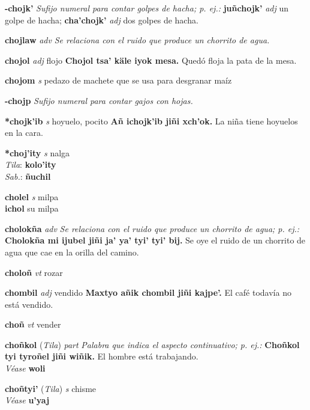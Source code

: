 \documentclass[10pt]{scrbook}
\newcommand{\entry}[1]{\textbf{#1}}
\newcommand{\nontranslationdef}[1]{\textit{#1}}
\newcommand{\partofspeech}[1]{\textit{#1}}
\newcommand{\spanishtranslation}[1]{#1}
\newcommand{\cholexample}[1]{\textbf{#1}}
\newcommand{\exampletranslation}[1]{#1}
\newcommand{\dialectvariant}[1]{\\\textit{#1}:}
\newcommand{\dialectword}[1]{\textbf{#1}}
\newcommand{\alsosee}[1]{\\\textit{Véase} \textbf{#1}}
\newcommand{\relevantdialect}[1]{(\textit{#1})}
\newcommand{\secondaryentry}[1]{\\\textbf{#1}}
\newcommand{\secondpartofspeech}[1]{\textit{#1}}
\newcommand{\secondtranslation}[1]{#1}
\begin{document}
\begin{multicols}{2}
\entry{-chojk'}
\nontranslationdef{Sufijo numeral para contar golpes de hacha; p. ej.:}
\cholexample{juñchojk'}
\secondpartofspeech{adj}
\exampletranslation{un golpe de hacha;}
\cholexample{cha'chojk'}
\secondpartofspeech{adj}
\exampletranslation{dos golpes de hacha.}

\entry{chojlaw}
\partofspeech{adv}
\nontranslationdef{Se relaciona con el ruido que produce un chorrito de agua.}

\entry{chojol}
\partofspeech{adj}
\spanishtranslation{flojo}
\cholexample{Chojol tsa' käle iyok mesa.}
\exampletranslation{Quedó floja la pata de la mesa.}

\entry{chojom}
\partofspeech{s}
\spanishtranslation{pedazo de machete que se usa para desgranar maíz}

\entry{-chojp}
\nontranslationdef{Sufijo numeral para contar gajos con hojas.}

\entry{*chojk'ib}
\partofspeech{s}
\spanishtranslation{hoyuelo, pocito}
\cholexample{Añ ichojk'ib jiñi xch'ok.}
\exampletranslation{La niña tiene hoyuelos en la cara.}

\entry{*choj'ity}
\partofspeech{s}
\spanishtranslation{nalga}
\dialectvariant{Tila}
\dialectword{kolo'ity}
\dialectvariant{Sab.}
\dialectword{ñuchil}

\entry{cholel}
\partofspeech{s}
\spanishtranslation{milpa}
\secondaryentry{ichol}
\secondtranslation{su milpa}

\entry{cholokña}
\partofspeech{adv}
\nontranslationdef{Se relaciona con el ruido que produce un chorrito de agua; p. ej.:}
\cholexample{Cholokña mi ijubel jiñi ja' ya' tyi' tyi' bij.}
\exampletranslation{Se oye el ruido de un chorrito de agua que cae en la orilla del camino.}

\entry{choloñ}
\partofspeech{vt}
\spanishtranslation{rozar}

\entry{chombil}
\partofspeech{adj}
\spanishtranslation{vendido}
\cholexample{Maxtyo añik chombil jiñi kajpe'.}
\exampletranslation{El café todavía no está vendido.}

\entry{choñ}
\partofspeech{vt}
\spanishtranslation{vender}

\entry{choñkol}
\relevantdialect{Tila}
\partofspeech{part}
\nontranslationdef{Palabra que indica el aspecto continuativo; p. ej.:}
\cholexample{Choñkol tyi tyroñel jiñi wiñik.}
\exampletranslation{El hombre está trabajando.}
\alsosee{woli}

\entry{choñtyi'}
\relevantdialect{Tila}
\partofspeech{s}
\spanishtranslation{chisme}
\alsosee{u'yaj}


\end{multicols}
\end{document}
